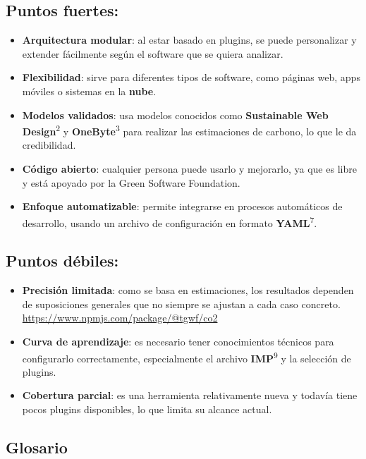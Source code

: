 \documentclass[12pt,a4paper]{report}
\begin{document}
\subsection*{Puntos fuertes:}

\begin{itemize}
  \item \textbf{Arquitectura modular}: al estar basado en plugins, se puede personalizar y extender fácilmente según el software que se quiera analizar.
  \item \textbf{Flexibilidad}: sirve para diferentes tipos de software, como páginas web, apps móviles o sistemas en la \textbf{nube}.
  \item \textbf{Modelos validados}: usa modelos conocidos como \textbf{Sustainable Web Design}\textsuperscript{2} y \textbf{OneByte}\textsuperscript{3} para realizar las estimaciones de carbono, lo que le da credibilidad.
  \item \textbf{Código abierto}: cualquier persona puede usarlo y mejorarlo, ya que es libre y está apoyado por la Green Software Foundation.
  \item \textbf{Enfoque automatizable}: permite integrarse en procesos automáticos de desarrollo, usando un archivo de configuración en formato \textbf{YAML}\textsuperscript{7}.
\end{itemize}

\subsection*{Puntos débiles:}

\begin{itemize}
  \item \textbf{Precisión limitada}: como se basa en estimaciones, los resultados dependen de suposiciones generales que no siempre se ajustan a cada caso concreto. \href{https://www.npmjs.com/package/@tgwf/co2}{https://www.npmjs.com/package/@tgwf/co2}
  \item \textbf{Curva de aprendizaje}: es necesario tener conocimientos técnicos para configurarlo correctamente, especialmente el archivo \textbf{IMP}\textsuperscript{9} y la selección de plugins.
  \item \textbf{Cobertura parcial}: es una herramienta relativamente nueva y todavía tiene pocos plugins disponibles, lo que limita su alcance actual.
\end{itemize}

\subsection*{Glosario}
\end{document}
